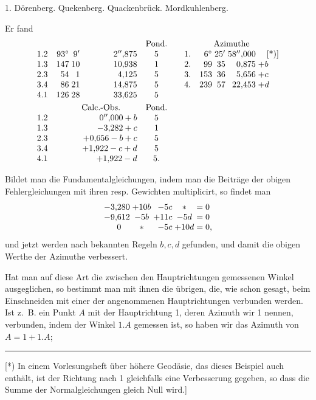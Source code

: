 \begin{center}
 1. Dörenberg. Quekenberg. Quackenbrück. Mordkuhlenberg.
\end{center}

Er fand
\[
\begin{array}{@{}r@{\quad}r@{\;}r@{\;}r@{\quad}c@{\qquad}l@{\quad}r@{\;}r@{\;}r@{\;}l@{}}
 \multicolumn{4}{c}{}&\text{Pond.}&
 \multicolumn{5}{c}{\text{Azimuthe}}\\
 1.2&93^\circ&9'&2''{,}875&5&1.&6^\circ&25'&58''{,}000&\quad\text{[*)]}\\
 1.3&147&10&10{,}938&1&2.&99&35&0{,}875&+b\\
 2.3&54&1&4{,}125&5&3.&153&36&5{,}656&+c\\
 3.4&86&21&14{,}875&5&4.&239&57&22{,}453&+d\\
 4.1&126&28&33{,}625&5&&&&&\\[3pt]
 &\multicolumn{3}{c}{\text{Calc.-Obs.}}&\text{Pond.}&&&&&\\
 1.2&&&0''{,}000+b&5&&&&&\\
 1.3&&&-3{,}282+c&1&&&&&\\
 2.3&&&+0{,}656-b+c&5&&&&&\\
 3.4&&&+1{,}922-c+d&5&&&&&\\
 4.1&&&+1{,}922-d&5.&&&&&
\end{array}
\]

Bildet man die Fundamentalgleichungen, indem man die Beiträge der obigen Fehlergleichungen mit ihren resp. Gewichten multiplicirt, so findet man
\[
\begin{array}{@{}r@{\;}c@{\;}r@{\;}c@{\;=\;}l@{}}
 -3{,}280&+10b&-5c&*&0\\
 -9{,}612&-5b&+11c&-5d&0\\
 \multicolumn{1}{c@{\;}}{0}&*&-5c&+10d&0,
\end{array}
\]
und jetzt werden nach bekannten Regeln \(b,c,d\) gefunden, und damit die obigen Werthe der Azimuthe verbessert.

Hat man auf diese Art die zwischen den Hauptrichtungen gemessenen Winkel ausgeglichen, so bestimmt man mit ihnen die übrigen, die, wie schon gesagt, beim Einschneiden mit einer der angenommenen Hauptrichtungen verbunden werden. Ist z.~B. ein Punkt \(A\) mit der Hauptrichtung 1, deren Azimuth wir 1 nennen, verbunden, indem der Winkel \(1.A\) gemessen ist, so haben wir das Azimuth von \(A=1+1.A\);

\par\smallskip\noindent\rule{4cm}{.4pt}\par
{\footnotesize\noindent\hspace*{\parindent}[*) In einem Vorlesungsheft über höhere Geodäsie, das dieses Beispiel auch enthält, ist der Richtung nach 1 gleichfalls eine Verbesserung gegeben, so dass die Summe der Normalgleichungen gleich Null wird.]\par}
\par\smallskip\noindent\makebox[.86\linewidth][r]{37\textsuperscript{*}}\par
\endgroup
